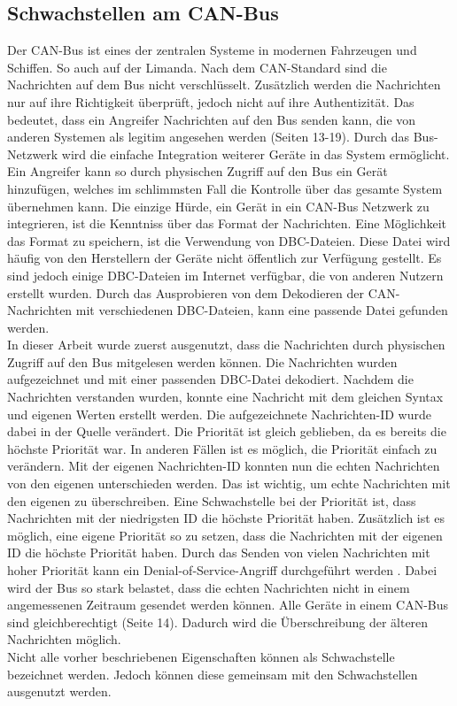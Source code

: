 \subsection{Schwachstellen am CAN-Bus}
Der CAN-Bus ist eines der zentralen Systeme in modernen Fahrzeugen und Schiffen. So auch auf der Limanda.
Nach dem CAN-Standard sind die Nachrichten auf dem Bus nicht verschlüsselt. Zusätzlich werden die Nachrichten nur 
auf ihre Richtigkeit überprüft, jedoch nicht auf ihre Authentizität. Das bedeutet, dass ein Angreifer Nachrichten auf den Bus
senden kann, die von anderen Systemen als legitim angesehen werden \cite{Voss2008} (Seiten 13-19). Durch das Bus-Netzwerk wird die einfache Integration
weiterer
Geräte in das System ermöglicht. Ein Angreifer kann so durch physischen Zugriff auf den Bus ein Gerät hinzufügen, welches im schlimmsten Fall
die Kontrolle über das gesamte System übernehmen kann. Die einzige Hürde, ein Gerät in ein CAN-Bus Netzwerk zu integrieren, ist die
Kenntniss über das Format der Nachrichten. Eine Möglichkeit das Format zu speichern, ist die Verwendung von DBC-Dateien.
Diese Datei wird häufig von den Herstellern der Geräte nicht öffentlich zur Verfügung gestellt.
Es sind jedoch einige DBC-Dateien im Internet verfügbar, die von anderen Nutzern erstellt wurden. Durch das Ausprobieren von dem Dekodieren
der CAN-Nachrichten mit verschiedenen DBC-Dateien, kann eine passende Datei gefunden werden. \\
In dieser Arbeit wurde zuerst ausgenutzt, dass die Nachrichten durch physischen Zugriff auf den Bus mitgelesen werden können.
Die Nachrichten wurden aufgezeichnet und mit einer passenden DBC-Datei dekodiert. Nachdem die Nachrichten verstanden wurden, konnte
eine Nachricht mit dem gleichen Syntax und eigenen Werten erstellt werden. Die aufgezeichnete Nachrichten-ID wurde dabei in der Quelle 
verändert. Die Priorität ist gleich geblieben, da es bereits die höchste Priorität war. In anderen Fällen ist es möglich, die Priorität
einfach zu verändern. Mit der eigenen Nachrichten-ID konnten nun die 
echten Nachrichten von den eigenen unterschieden werden. Das ist wichtig, um echte Nachrichten mit den eigenen zu überschreiben. 
Eine Schwachstelle bei der Priorität ist, dass Nachrichten mit der niedrigsten ID die höchste Priorität haben. Zusätzlich ist es möglich, 
eine eigene Priorität so zu setzen, dass die Nachrichten mit der eigenen ID die höchste Priorität haben. Durch das Senden von
vielen Nachrichten mit hoher Priorität kann ein Denial-of-Service-Angriff durchgeführt werden \cite{Murvay2018}. 
Dabei wird der Bus so stark belastet,
dass die echten Nachrichten nicht in einem angemessenen Zeitraum gesendet werden können. 
Alle Geräte in einem CAN-Bus sind gleichberechtigt\cite{Voss2008} (Seite 14). Dadurch wird die Überschreibung der älteren Nachrichten möglich.\\
Nicht alle vorher beschriebenen Eigenschaften können als Schwachstelle bezeichnet werden. Jedoch können diese gemeinsam mit den
Schwachstellen ausgenutzt werden. \\

